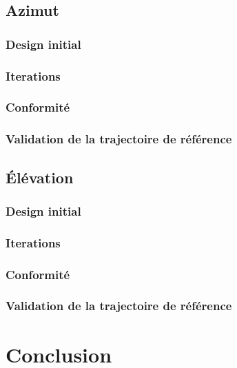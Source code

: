 \documentclass{udes_rapport} %
\begin{document}
\subsection{Azimut}
\subsubsection{Design initial}
\subsubsection{Iterations}

\subsubsection{Conformité}
\subsubsection{Validation de la trajectoire de référence}
\subsection{Élévation}
\subsubsection{Design initial}
\subsubsection{Iterations}

\subsubsection{Conformité}
\subsubsection{Validation de la trajectoire de référence}
\section{Conclusion}
\end{document}

